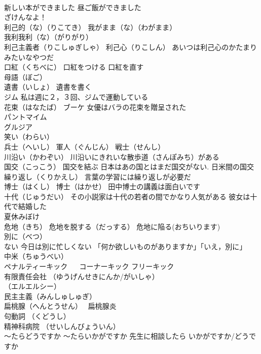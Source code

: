 \documentclass[8pt]{extreport}
\begin{document}
\begin{CJK}{UTF8}{min}
\\	新しい本ができました 昼ご飯ができました
\\	ざけんなよ！
\\	利己的（な）（りこてき） 我がまま（な）（わがまま）
\\	我利我利（な）（がりがり）
\\	利己主義者（りこしゅぎしゃ） 利己心（りこしん） あいつは利己心のかたまりみたいなやつだ
\\	口紅（くちべに） 口紅をつける 口紅を直す
\\	母語（ぼご）
\\	遺書（いしょ） 遺書を書く
\\	ジム 私は週に２，３回、ジムで運動している
\\	花束（はなたば） ブーケ 女優はバラの花束を贈呈された
\\	パントマイム
\\	グルジア
\\	笑い（わらい）
\\	兵士（へいし） 軍人（ぐんじん） 戦士（せんし）
\\	川沿い（かわぞい） 川沿いにきれいな散歩道（さんぽみち）がある
\\	国交（こっこう） 国交を結ぶ 日本はあの国とはまだ国交がない. 日米間の国交
\\	繰り返し（くりかえし） 言葉の学習には繰り返しが必要だ
\\	博士（はくし） 博士（はかせ） 田中博士の講義は面白いです
\\	十代（じゅうだい） その小説家は十代の若者の間でかなり人気がある 彼女は十代で結婚した
\\	夏休みぼけ
\\	危地（きち） 危地を脱する（だっする） 危地に陥る(おちいります)
\\	別に（べつ）　
\\	ない 今日は別に忙しくない 「何か欲しいものがありますか」「いえ，別に」
\\	中米（ちゅうべい）
\\	ペナルティーキック 　 コーナーキック フリーキック
\\	有限責任会社 （ゆうげんせきにんか/がいしゃ） 
\\	（エルエルシー） 
\\	民主主義（みんしゅしゅぎ）
\\	扁桃腺（へんとうせん）　 扁桃腺炎
\\	句動詞 （くどうし）
\\	精神科病院 （せいしんびょういん）
\\	～たらどうですか ～たらいかがですか 先生に相談したら いかがですか/どうですか

\end{CJK}
\end{document}
